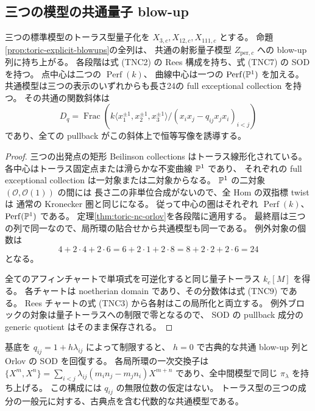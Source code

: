 \subsection{三つの模型の共通量子 blow-up}

\begin{corollary}\label{cor:toric-nc-common}
三つの標準模型のトーラス型量子化を $X_{3,c},X_{12,c},X_{111,c}$ とする。
命題\ref{prop:toric-explicit-blowups}の全列は、
共通の射影量子模型 $Z_{\mathrm{per},c}$ への blow-up 列に持ち上がる。
各段階は式 (TNC2) の Rees 構成を持ち、式 (TNC7) の SOD を持つ。
点中心は二つの $\operatorname{Perf}(k)$、
曲線中心は一つの $\operatorname{Perf}(\mathbb P^1)$ を加える。
共通模型は三つの表示のいずれからも長さ24の full exceptional collection を持つ。
その共通の関数斜体は
\[
 D_q
 =
 \operatorname{Frac}\!
 \left(
 k\langle x_1^{\pm1},x_2^{\pm1},x_3^{\pm1}\rangle/
 (x_ix_j-q_{ij}x_jx_i)_{i<j}
 \right)
 \tag{TNC9}
\]
であり、全ての pullback がこの斜体上で恒等写像を誘導する。
\end{corollary}
\begin{proof}
三つの出発点の矩形 Beilinson collections はトーラス線形化されている。
各中心はトーラス固定点または滑らかな不変曲線 $\mathbb P^1$ であり、
それぞれの full exceptional collection は一対象または二対象からなる。
$\mathbb P^1$ の二対象 $(\mathcal O,\mathcal O(1))$ の間には
長さ二の非単位合成がないので、全 Hom の双指標 twist は
通常の Kronecker 圏と同じになる。
従って中心の圏はそれぞれ $\operatorname{Perf}(k)$、
$\operatorname{Perf}(\mathbb P^1)$ である。
定理\ref{thm:toric-nc-orlov}を各段階に適用する。
最終扇は三つの列で同一なので、局所環の貼合せから共通模型も同一である。
例外対象の個数は
\[
 4+2\cdot4+2\cdot6
 =
 6+2\cdot1+2\cdot8
 =
 8+2\cdot2+2\cdot6
 =24
\]
となる。

全てのアフィンチャートで単項式を可逆化すると同じ量子トーラス $k_c[M]$ を得る。
各チャートは noetherian domain であり、その分数体は式 (TNC9) である。
Rees チャートの式 (TNC3) から各射はこの局所化と両立する。
例外ブロックの対象は量子トーラスへの制限で零となるので、
SOD の pullback 成分の generic quotient はそのまま保存される。
\end{proof}

基底を $q_{ij}=1+h\lambda_{ij}$ によって制限すると、
$h=0$ で古典的な共通 blow-up 列と Orlov の SOD を回復する。
各局所環の一次交換子は
$\{X^m,X^n\}
=\sum_{i<j}\lambda_{ij}(m_i n_j-m_j n_i)X^{m+n}$
であり、全中間模型で同じ $\pi_\lambda$ を持ち上げる。
この構成には $q_{ij}$ の無限位数の仮定はない。
トーラス型の三つの成分の一般元に対する、古典点を含む代数的な共通模型である。
